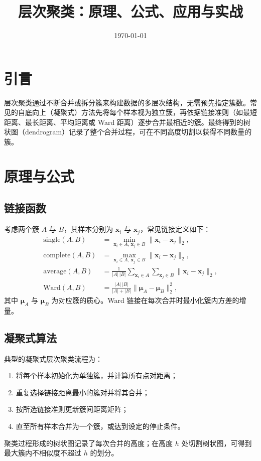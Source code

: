 \documentclass[UTF8,zihao=-4]{ctexart}
\title{层次聚类：原理、公式、应用与实战}
\author{}
\date{\today}
\begin{document}
\maketitle

\section{引言}
层次聚类通过不断合并或拆分簇来构建数据的多层次结构，无需预先指定簇数。常见的自底向上（凝聚式）方法先将每个样本视为独立簇，再依据链接准则（如最短距离、最长距离、平均距离或 Ward 距离）逐步合并最相近的簇。最终得到的树状图（dendrogram）记录了整个合并过程，可在不同高度切割以获得不同数量的簇。

\section{原理与公式}
\subsection{链接函数}
考虑两个簇 \(A\) 与 \(B\)，其样本分别为 \(\mathbf{x}_i\) 与 \(\mathbf{x}_j\)，常见链接定义如下：
\begin{align}
\text{single}(A,B) &= \min_{\mathbf{x}_i \in A,\, \mathbf{x}_j \in B} \lVert \mathbf{x}_i - \mathbf{x}_j \rVert_2,\\
\text{complete}(A,B) &= \max_{\mathbf{x}_i \in A,\, \mathbf{x}_j \in B} \lVert \mathbf{x}_i - \mathbf{x}_j \rVert_2,\\
\text{average}(A,B) &= \frac{1}{|A|\,|B|} \sum_{\mathbf{x}_i \in A} \sum_{\mathbf{x}_j \in B} \lVert \mathbf{x}_i - \mathbf{x}_j \rVert_2,\\
\text{Ward}(A,B) &= \frac{|A|\,|B|}{|A|+|B|} \lVert \bm{\mu}_A - \bm{\mu}_B \rVert_2^2,
\end{align}
其中 \(\bm{\mu}_A\) 与 \(\bm{\mu}_B\) 为对应簇的质心。Ward 链接在每次合并时最小化簇内方差的增量。

\subsection{凝聚式算法}
典型的凝聚式层次聚类流程为：
\begin{enumerate}
  \item 将每个样本初始化为单独簇，并计算所有点对距离；
  \item 重复选择链接距离最小的簇对并将其合并；
  \item 按所选链接准则更新簇间距离矩阵；
  \item 直至所有样本合并为一个簇，或达到设定的停止条件。
\end{enumerate}
聚类过程形成的树状图记录了每次合并的高度；在高度 \(h\) 处切割树状图，可得到最大簇内不相似度不超过 \(h\) 的划分。
\end{document}
